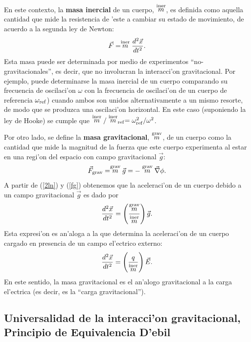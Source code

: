 En este contexto, la \textbf{masa inercial} de un cuerpo, $\stackrel{\rm iner}{m}$, es definida como aquella cantidad que mide la resistencia de 'este a cambiar su estado de movimiento, de acuerdo a la segunda ley de Newton:
\begin{equation}\label{2ln}
\vec{F}=\stackrel{\rm iner}{m}\frac{d^2\vec{x}}{dt^2}.
\end{equation}
Esta masa puede ser determinada por medio de experimentos ``no-gravitacionales'', es decir, que no involucran la interacci'on gravitacional. Por ejemplo, puede determinarse la masa inercial de un cuerpo comparando su frecuencia de oscilaci'on $\omega$ con la frecuencia de oscilaci'on de un cuerpo de referencia $\omega_{\rm ref}$) cuando ambos son unidos alternativamente a un mismo resorte, de modo que se produzca una oscilaci'on horizontal. En este caso (suponiendo la ley de Hooke) se cumple que $\stackrel{\rm iner}{m}/\stackrel{\rm iner}{m}_{\rm ref}=\omega_{\rm ref}^2/\omega^2$.

Por otro lado, se define la \textbf{masa gravitacional}, $\stackrel{\rm grav}{m}$, de un cuerpo como la cantidad que mide la magnitud de la fuerza que este cuerpo experimenta al estar en una regi'on del espacio con campo gravitacional $\vec{g}$:
\begin{equation}\label{fg}
\vec{F}_{\rm grav}=\stackrel{\rm grav}{m}\vec{g}=-\stackrel{\rm grav}{m}\vec\nabla\phi.
\end{equation}
A partir de (\ref{2ln}) y (\ref{fg}) obtenemos que la aceleraci'on de un cuerpo debido a un campo gravitacional $\vec{g}$ es dado por
\begin{equation}\label{amimg}
\frac{d^2\vec{x}}{dt^2}=\left(\frac{\stackrel{\rm grav}{m}}{\stackrel{\rm iner}{m}}\right)\vec{g}.
\end{equation}
Esta expresi'on es an'aloga a la que determina la aceleraci'on de un cuerpo cargado en presencia de un campo el'ectrico externo:
\begin{equation}\label{aqE}
\frac{d^2\vec{x}}{dt^2}=\left(\frac{q}{\stackrel{\rm iner}{m}}\right)\vec{E}.
\end{equation}
En este sentido, la masa gravitacional es el an'alogo gravitacional a la carga el'ectrica (es decir, es la ``carga gravitacional'').


\subsection{Universalidad de la interacci'on gravitacional, Principio de Equivalencia D'ebil}

